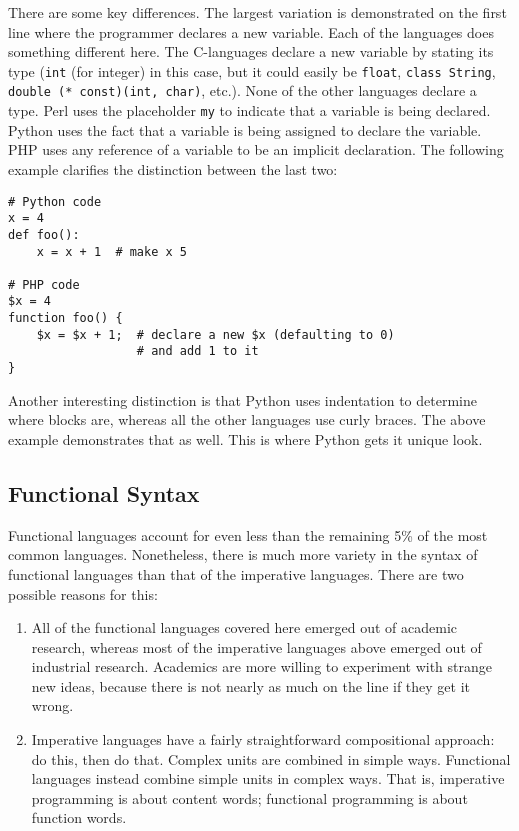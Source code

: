 \documentclass[12pt]{article}
\begin{document}
There are some key differences.  The largest variation is demonstrated
on the first line where the programmer declares a new variable.  Each of
the languages does something different here.  The C-languages declare a
new variable by stating its type (\texttt{int} (for integer) in this
case, but it could easily be \texttt{float}, \texttt{class String},
\texttt{double (* const)(int, char)}, etc.).  None of the other
languages declare a type.  Perl uses the placeholder \texttt{my} to
indicate that a variable is being declared.  Python uses the fact that a
variable is being assigned to declare the variable.  PHP uses any
reference of a variable to be an implicit declaration.  The following
example clarifies the distinction between the last two:

\begin{verbatim}
# Python code
x = 4
def foo():
    x = x + 1  # make x 5

# PHP code
$x = 4
function foo() {
    $x = $x + 1;  # declare a new $x (defaulting to 0)
                  # and add 1 to it
}
\end{verbatim}

Another interesting distinction is that Python uses indentation to
determine where blocks are, whereas all the other languages use curly
braces.  The above example demonstrates that as well.  This is where
Python gets it unique look.

\subsection{Functional Syntax}

Functional languages account for even less than the remaining 5\% of the
most common languages.  Nonetheless, there is much more variety in the
syntax of functional languages than that of the imperative languages.
There are two possible reasons for this: 

\begin{enumerate}
\item All of the functional languages covered here emerged out of
academic research, whereas most of the imperative languages above
emerged out of industrial research.  Academics are more willing to
experiment with strange new ideas, because there is not nearly as much
on the line if they get it wrong.  
\item Imperative languages have a fairly straightforward compositional
approach: do this, then do that.  Complex units are combined in simple
ways.  Functional languages instead combine simple units in complex
ways.  That is, imperative programming is about content words;
functional programming is about function words.
\end{enumerate}
\end{document}
